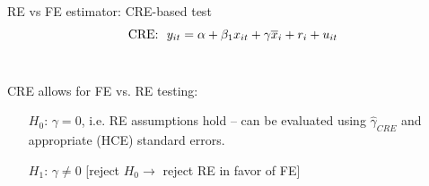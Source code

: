 \documentclass[usenames,dvipsnames]{beamer}
\begin{document}
\begin{frame}{RE vs FE estimator: CRE-based test}
$$ \textnormal{CRE:}~~y_{it} = \alpha + \beta_1 x_{it} + \gamma \overline{x}_i + r_i + u_{it}$$ \\ \bigskip

CRE allows for FE vs. RE testing: \\ \medskip
	\begin{itemize}
	\item[$H_0$:] $\gamma = 0$, i.e. RE assumptions hold -- can be evaluated using $\hat{\gamma}_{\textit{CRE}}$ and appropriate (HCE) standard errors.
	\medskip
	\item[$H_1$:] $\gamma \neq 0$ [reject $H_0\rightarrow$ reject RE in favor of FE]
	\end{itemize}
\end{frame}
\end{document}
